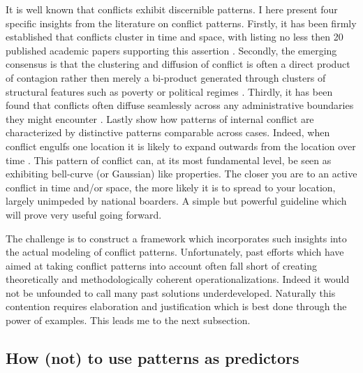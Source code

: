 \documentclass[a4paper]{article}
\begin{document}
It is well known that conflicts exhibit discernible patterns. I here present four specific insights from the literature on conflict patterns. Firstly, it has been firmly established that conflicts cluster in time and space, with \cite{crost2015conflict} listing no less then 20 published academic papers supporting this assertion \citep[15]{crost2015conflict}. Secondly, the emerging consensus is that the clustering and diffusion of conflict is often a direct product of contagion rather then merely a bi-product generated through clusters of structural features such as poverty or political regimes \citep{buhaug2008contagion,schutte2011diffusion,crost2015conflict,bara_2017}. Thirdly, it has been found that conflicts often diffuse seamlessly across any administrative boundaries they might encounter \cite[442-443]{ol2010afghanistan}. Lastly \cite{schutte2011diffusion} show how patterns of internal conflict are characterized by distinctive patterns comparable across cases. Indeed, when conflict engulfs one location it is likely to expand outwards from the location over time \citep[151]{schutte2011diffusion}. This pattern of conflict can, at its most fundamental level, be seen as exhibiting bell-curve (or Gaussian) like properties. The closer you are to an active conflict in time and/or space, the more likely it is to spread to your location, largely unimpeded by national boarders. A simple but powerful guideline which will prove very useful going forward.\par

The challenge is to construct a framework which incorporates such insights into the actual modeling of conflict patterns. Unfortunately, past efforts which have aimed at taking conflict patterns into account often fall short of creating theoretically and methodologically coherent operationalizations. Indeed it would not be unfounded to call many past solutions underdeveloped. Naturally this contention requires elaboration and justification which is best done through the power of examples. This leads me to the next subsection.\par

\subsection{How (not) to use patterns as predictors}
\end{document}
